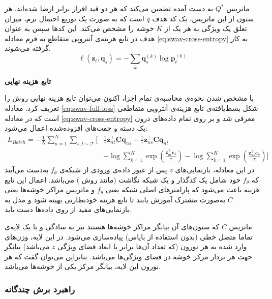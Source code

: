 ماتریس $Q^*$ به دست آمده تضمین می‌کند که هر دو قید افراز برابر ارضا شده‌اند. هر ستون از این ماتریس، یک کد هدف $q$
است که به صورت یک توزیع احتمال نرم، میزان تعلق یک ویژگی به هر یک از 
$K$
خوشه را مشخص می‌کند. این کدها سپس به عنوان هدف در تابع هزینه‌ی آنتروپی متقاطع به فرم معادله \ref{eq:swav-cross-entropy} به کار گرفته می‌شوند.
\begin{equation}
    \ell(\mathbf{z}_t, \mathbf{q}_s) = - \sum_k \mathbf{q}_s^{(k)} \log \mathbf{p}_t^{(k)}
    \label{eq:swav-cross-entropy}
\end{equation}

\vspace{0.5em}
\noindent\textbf{تابع هزینه نهایی}

با مشخص شدن نحوه‌ی محاسبه‌ی تمام اجزا، اکنون می‌توان تابع هزینه نهایی روش  را تعریف کرد. معادله \ref{eq:swav-full-loss} شکل بسط‌یافته‌ی تابع هزینه‌ی آنتروپی متقاطعی است که در معادله \ref{eq:swav-cross-entropy} معرفی شد و بر روی تمام داده‌های درون یک دسته و جفت‌های افزوده‌شده اعمال می‌شود:
\begin{align}
    L_{Batch}=-\frac{1}{N} \sum_{n=1}^{N} \sum_{s,t \sim \mathcal{T}} 
    \Bigg[
    &\frac{1}{\tau} \mathbf{z}_{nt}^\top \mathbf{C}\mathbf{q}_{ns} 
    + \frac{1}{\tau} \mathbf{z}_{ns}^\top \mathbf{C}\mathbf{q}_{nt} \nonumber \\
    &- \log \sum_{k=1}^{K} \exp \left( \frac{\mathbf{z}_{nt}^\top \mathbf{c}_k}{\tau} \right) 
    - \log \sum_{k=1}^{K} \exp \left( \frac{\mathbf{z}_{ns}^\top \mathbf{c}_k}{\tau} \right)
    \Bigg]
    \label{eq:swav-full-loss}
\end{align}
در این معادله، بازنمایی‌های $z$
پس از عبور داده‌ی ورودی از شبکه‌ی $f_\theta$ به‌دست می‌آیند که $f_\theta$
خود شامل یک کدگذار و یک شبکه نگاشت (مانند روش )
می‌باشد. اعمال این تابع هزینه باعث می‌شود که پارامترهای اصلی شبکه یعنی $f_\theta$ و ماتریس مراکز خوشه‌ها یعنی $C$ به‌صورت مشترک آموزش یابند تا تابع هزینه خودنظارتی بهینه شود و مدل به بازنمایی‌های مفید از روی داده‌ها دست یابد.

ماتریس $C$ که ستون‌های آن بیانگر مراکز خوشه‌ها هستند نیز به سادگی و با یک لایه‌ی تماما متصل خطی (بدون استفاده از بایاس) پیاده‌سازی می‌شود. در این لایه، وزن‌های وارد شده به هر نورون (که تعداد آن‌ها برابر با ابعاد فضای ویژگی $z$ می‌باشد) بیانگر جهت هر بردار مرکز خوشه در فضای ویژگی‌ها می‌باشد. بنابراین می‌توان گفت که هر نورون این لایه، بیانگر مرکز یکی از خوشه‌ها می‌باشد.

\subsubsection{راهبرد برش چندگانه}

